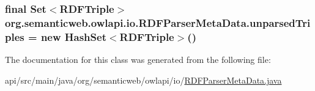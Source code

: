 \hypertarget{classorg_1_1semanticweb_1_1owlapi_1_1io_1_1_r_d_f_parser_meta_data_aa970fdfd829ac4fe15e10b49ac670c1c}{
\subsubsection[{unparsed\-Triples}]{\setlength{\rightskip}{0pt plus 5cm}final Set$<${\bf R\-D\-F\-Triple}$>$ org.\-semanticweb.\-owlapi.\-io.\-R\-D\-F\-Parser\-Meta\-Data.\-unparsed\-Triples = new Hash\-Set$<${\bf R\-D\-F\-Triple}$>$()\hspace{0.3cm}{\ttfamily [private]}}}\label{classorg_1_1semanticweb_1_1owlapi_1_1io_1_1_r_d_f_parser_meta_data_aa970fdfd829ac4fe15e10b49ac670c1c}


The documentation for this class was generated from the following file\-:\begin{DoxyCompactItemize}
\item 
api/src/main/java/org/semanticweb/owlapi/io/\hyperlink{_r_d_f_parser_meta_data_8java}{R\-D\-F\-Parser\-Meta\-Data.\-java}\end{DoxyCompactItemize}
